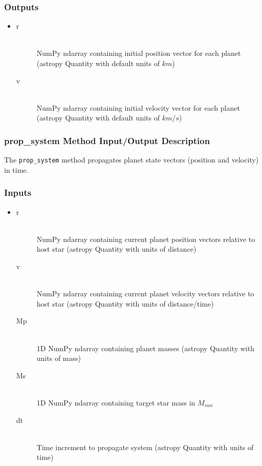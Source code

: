 \documentclass[cleanfoot]{asme2ej}
\begin{document}
\subsubsection*{Outputs}
\begin{itemize}
    \item 
    \begin{description}
        \item[r] \hfill \\
        NumPy ndarray containing initial position vector for each planet (astropy Quantity with default units of $ km $)
        \item[v] \hfill \\
        NumPy ndarray containing initial velocity vector for each planet (astropy Quantity with default units of $ km/s $)
    \end{description}
\end{itemize}

\subsubsection{prop\_system Method Input/Output Description} \label{sec:propsystemtask}
The \verb+prop_system+ method propagates planet state vectors (position and velocity) in time.

\subsubsection*{Inputs}
\begin{itemize}
    \item 
    \begin{description}
        \item[r] \hfill \\
        NumPy ndarray containing current planet position vectors relative to host star (astropy Quantity with units of distance)
        \item[v] \hfill \\
        NumPy ndarray containing current planet velocity vectors relative to host star (astropy Quantity with units of distance/time)
        \item[Mp] \hfill \\
        1D NumPy ndarray containing planet masses (astropy Quantity with units of mass)
        \item[Ms] \hfill \\
        1D NumPy ndarray containing target star mass in $ M_{sun} $
        \item[dt] \hfill \\
        Time increment to propagate system (astropy Quantity with units of time)
    \end{description}
\end{itemize}
\end{document}
